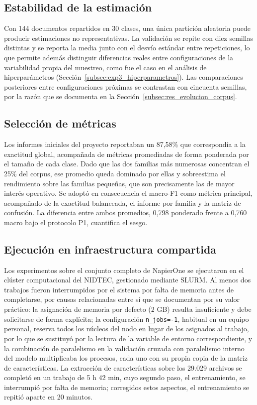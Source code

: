 \subsection{Estabilidad de la estimación}

Con 144 documentos repartidos en 30 clases, una única partición aleatoria puede producir estimaciones no representativas. La validación se repite con diez semillas distintas y se reporta la media junto con el desvío estándar entre repeticiones, lo que permite además distinguir diferencias reales entre configuraciones de la variabilidad propia del muestreo, como fue el caso en el análisis de hiperparámetros (Sección~\ref{subsec:exp3_hiperparametros}). Las comparaciones posteriores entre configuraciones próximas se contrastan con cincuenta semillas, por la razón que se documenta en la Sección~\ref{subsec:res_evolucion_corpus}.

\subsection{Selección de métricas}

Los informes iniciales del proyecto reportaban un 87,58\% que correspondía a la exactitud global, acompañada de métricas promediadas de forma ponderada por el tamaño de cada clase. Dado que las dos familias más numerosas concentran el 25\% del corpus, ese promedio queda dominado por ellas y sobreestima el rendimiento sobre las familias pequeñas, que son precisamente las de mayor interés operativo. Se adoptó en consecuencia el macro-F1 como métrica principal, acompañado de la exactitud balanceada, el informe por familia y la matriz de confusión. La diferencia entre ambos promedios, 0,798 ponderado frente a 0,760 macro bajo el protocolo P1, cuantifica el sesgo.

\subsection{Ejecución en infraestructura compartida}

Los experimentos sobre el conjunto completo de NapierOne se ejecutaron en el clúster computacional del NIDTEC, gestionado mediante SLURM. Al menos dos trabajos fueron interrumpidos por el sistema por falta de memoria antes de completarse, por causas relacionadas entre sí que se documentan por su valor práctico: la asignación de memoria por defecto (2 GB) resulta insuficiente y debe solicitarse de forma explícita; la configuración \texttt{n\_jobs=-1}, habitual en un equipo personal, reserva todos los núcleos del nodo en lugar de los asignados al trabajo, por lo que se sustituyó por la lectura de la variable de entorno correspondiente, y la combinación de paralelismo en la validación cruzada con paralelismo interno del modelo multiplicaba los procesos, cada uno con su propia copia de la matriz de características. La extracción de características sobre los 29.029 archivos se completó en un trabajo de 5 h 42 min, cuyo segundo paso, el entrenamiento, se interrumpió por falta de memoria; corregidos estos aspectos, el entrenamiento se repitió aparte en 20 minutos.

